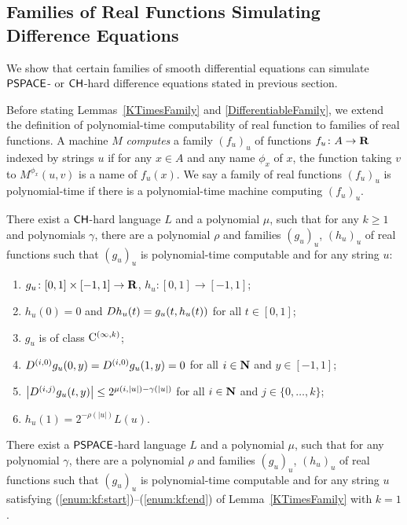 \subsection{Families of Real Functions Simulating Difference Equations}
\label{subsection: ode family}
We show that certain families of smooth differential equations can simulate 
$\mathsf{PSPACE}$- or $\mathsf{CH}$-hard difference equations stated in previous section.

Before stating Lemmas~\ref{KTimesFamily} and \ref{DifferentiableFamily},
we extend the definition of polynomial-time computability of real function
to families of real functions.
A machine $M$ \emph{computes} a family $(f_u)_u$ of functions $f _u \colon A \to \mathbf R$ 
indexed by strings $u$
if for any $x \in A$ and any name $\phi_x$ of $x$,
the function taking $v$ to $M ^{\phi _x} (u, v)$ is a name of $f _u (x)$.
We say a family of real functions $(f_u)_u$ is polynomial-time if there is
a polynomial-time machine computing $(f_u)_u$.

 \begin{lemma}
  \label{KTimesFamily}
  There exist a $\mathsf{CH}$-hard language $L$ and a polynomial $\mu$,
  such that for any $k \ge 1$ and polynomials $\gamma$,
  there are a polynomial $\rho$ and families $(g_u)_u$, $(h_u)_u$ of real functions
  such that $(g_u)_u$ is polynomial-time computable and for any string $u$:
  \begin{enumerate}
   \item \label{enum:kf:start}
	 $g_u\colon [0,1] \times [-1,1]\to \mathbf R$, $h_u\colon [0,1] \to [-1,1]$;
   \item \label{enum:equation}
	 $h_u(0) = 0$ and $D h_u(t) = g_u(t, h_u(t))$ for all $t \in [0,1]$;
   \item \label{enum:differentiability}
         $g_u$ is of class $\mathrm C^{(\infty, k)}$;
   \item \label{enum:boundary}
	 $
	 D^{(i, 0)} g_u(0,y) = D^{(i, 0)} g_u(1,y) = 0
         $ for all $i \in \mathbf N$ and $y \in [-1,1]$;
   \item \label{enum:smooth}
	 $
	 \left|D^{(i,j)} g_u(t,y)\right| \le 2^{\mu(i, |u|) - \gamma(|u|)}
         $ for all $i \in \mathbf N$ and $j \in \{0, \dots, k\}$;
   \item \label{enum:kf:end}
	 $h_u(1) = 2^{-\rho(|u|)} L(u)$.
  \end{enumerate}
 \end{lemma}

\begin{lemma}
 \label{DifferentiableFamily}
 There exist a $\mathsf{PSPACE}$-hard language $L$ and a polynomial $\mu$,
 such that for any polynomial $\gamma$,
 there are a polynomial $\rho$ and families $(g_u)_u$, $(h_u)_u$ of real functions
 such that $(g_u)_u$ is polynomial-time computable and for any string $u$
 satisfying (\ref{enum:kf:start})--(\ref{enum:kf:end}) of Lemma~\ref{KTimesFamily} with $k = 1$.
\end{lemma}

